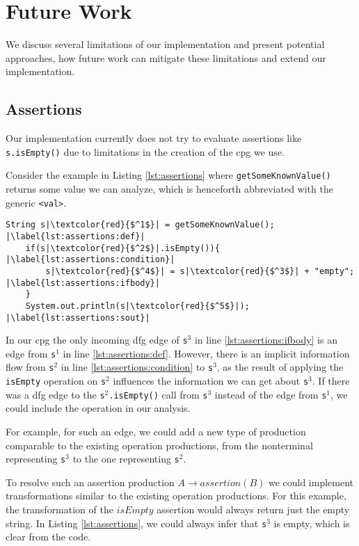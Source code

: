 \section{Future Work}

We discuss several limitations of our implementation and present potential approaches, how future work can mitigate these limitations and extend our implementation.

\subsection{Assertions}

Our implementation currently does not try to evaluate assertions like \lstinline|s.isEmpty()| due to limitations in the creation of the \ac{cpg} we use.

Consider the example in Listing \ref{lst:assertions} where \lstinline|getSomeKnownValue()| returns some value we can analyze, which is henceforth abbreviated with the generic \lstinline|<val>|.

\begin{lstlisting}[caption={Assertion Example}, label=lst:assertions, numbers=right, escapechar=|]
	String s|\textcolor{red}{$^1$}| = getSomeKnownValue(); |\label{lst:assertions:def}|
	if(s|\textcolor{red}{$^2$}|.isEmpty()){ |\label{lst:assertions:condition}|
		s|\textcolor{red}{$^4$}| = s|\textcolor{red}{$^3$}| + "empty"; |\label{lst:assertions:ifbody}|
	}
	System.out.println(s|\textcolor{red}{$^5$}|); |\label{lst:assertions:sout}|
\end{lstlisting}

In our \ac{cpg} the only incoming \ac{dfg} edge of \lstinline|s|$^3$ in line \ref{lst:assertions:ifbody} is an edge from \lstinline|s|$^1$ in line \ref{lst:assertions:def}. However, there is an implicit information flow from \lstinline|s|$^2$ in line \ref{lst:assertions:condition} to \lstinline|s|$^3$, as the result of applying the \lstinline|isEmpty| operation on \lstinline|s|$^2$ influences the information we can get about \lstinline|s|$^3$. If there was a \ac{dfg} edge to the \lstinline|s|$^2$\lstinline|.isEmpty()| call from \lstinline|s|$^3$ instead of the edge from \lstinline|s|$^1$, we could include the operation in our analysis.

For example, for such an edge, we could add a new type of production comparable to the existing operation productions, from the nonterminal representing \lstinline|s|$^3$ to the one representing \lstinline|s|$^2$.

To resolve such an assertion production $A \rightarrow assertion(B)$ we could implement transformations similar to the existing operation productions. For this example, the transformation of the $isEmpty$ assertion would always return just the empty string.
In Listing \ref{lst:assertions}, we could always infer that \lstinline|s|$^3$ is empty, which is clear from the code.

